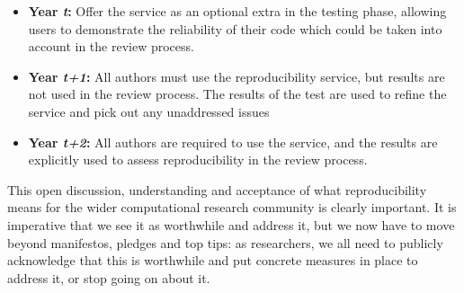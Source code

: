 \documentclass[conference]{IEEEtran}
\begin{document}
\begin{itemize}
\item {\textbf{Year {\emph{t}}:}} Offer the service as an optional extra in the
  testing phase, allowing users to demonstrate the reliability of
  their code which could be taken into account in the review process.
\item {\textbf{Year {\emph{t+1}}:}} All authors must use the reproducibility
  service, but results are not used in the review process. The results
  of the test are used to refine the service and pick out any
  unaddressed issues
\item {\textbf{Year {\emph{t+2}}:}} All authors are required to use the service, and
  the results are explicitly used to assess reproducibility in the
  review process.
\end{itemize}

This open discussion, understanding and acceptance of what
reproducibility means for the wider computational research community
is clearly important. It is imperative that we see it as worthwhile
and address it, but we now have to move beyond manifestos, pledges and
top tips: as researchers, we all need to publicly acknowledge that
this is worthwhile and put concrete measures in place to address it,
or stop going on about it.






\end{document}
